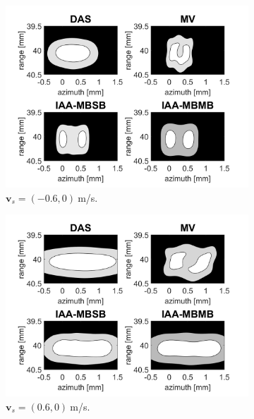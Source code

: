 \begin{figure}[ht]
    \centering
    \begin{subfigure}[t]{0.48\linewidth}
        \includegraphics[width=\linewidth]{./images/results/2.2/motion_0_-06.png}
        \caption{$\boldsymbol{v}_s = (-0.6, 0)~$m/s.}
    \end{subfigure}
    \quad
    \begin{subfigure}[t]{0.48\linewidth}
        \includegraphics[width=\linewidth]{./images/results/2.2/motion_0_06.png}
        \caption{$\boldsymbol{v}_s = (0.6, 0)~$m/s.}
        \label{fig:double_lateral}
    \end{subfigure}
    \quad
    \begin{subfigure}[t]{0.48\linewidth}

\end{subfigure}
\end{figure}
